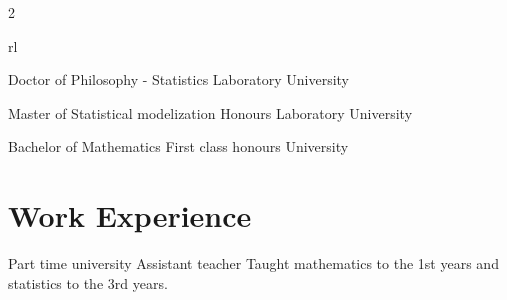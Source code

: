 \documentclass[10pt]{article} %
\begin{document}
\begin{paracol}{2}
\begin{supertabular}{rl} %

	
	{Doctor of Philosophy - Statistics} %
	{} %
	{Laboratory} %
	{University} %
	
	
	{Master of Statistical modelization} %
	{Honours} %
	{Laboratory} %
	{University} %
	
	
	{Bachelor of Mathematics} %
	{First class honours} %
	{} %
	{University} %
	

\end{supertabular}

\section{Work Experience}




{Part time} %
{university} %
{Assistant teacher} %
{Taught mathematics to the 1st years and statistics to the 3rd years.} %



\end{paracol}
\end{document}
